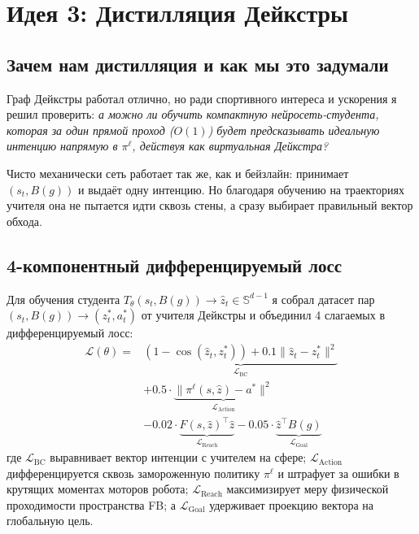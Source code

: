 \section{Идея 3: Дистилляция Дейкстры}

\subsection{Зачем нам дистилляция и как мы это задумали}

Граф Дейкстры работал отлично, но ради спортивного интереса и ускорения я решил проверить: \textit{а можно ли обучить компактную нейросеть-студента, которая за один прямой проход ($O(1)$) будет предсказывать идеальную интенцию напрямую в $\pi^\ell$, действуя как виртуальная Дейкстра?}

Чисто механически сеть работает так же, как и бейзлайн: принимает $(s_t, B(g))$ и выдаёт одну интенцию. Но благодаря обучению на траекториях учителя она не пытается идти сквозь стены, а сразу выбирает правильный вектор обхода.

\subsection{4-компонентный дифференцируемый лосс}

Для обучения студента $T_\theta(s_t, B(g)) \to \hat{z}_t \in \mathbb{S}^{d-1}$ я собрал датасет пар $(s_t, B(g)) \to (z^*_t, a^*_t)$ от учителя Дейкстры и объединил 4 слагаемых в дифференцируемый лосс:
\begin{equation}
\label{eq:distillation_loss}
\begin{split}
\mathcal{L}(\theta) = {} & \underbrace{(1 - \cos(\hat{z}_t, z^*_t)) + 0.1 \|\hat{z}_t - z^*_t\|^2}_{\mathcal{L}_{\text{BC}}} \\
& + 0.5 \cdot \underbrace{\|\pi^\ell(s, \hat{z}) - a^*\|^2}_{\mathcal{L}_{\text{Action}}} \\
& - 0.02 \cdot \underbrace{F(s, \hat{z})^\top \hat{z}}_{\mathcal{L}_{\text{Reach}}} - 0.05 \cdot \underbrace{\hat{z}^\top B(g)}_{\mathcal{L}_{\text{Goal}}}
\end{split}
\end{equation}
где $\mathcal{L}_{\text{BC}}$ выравнивает вектор интенции с учителем на сфере; $\mathcal{L}_{\text{Action}}$ дифференцируется сквозь замороженную политику $\pi^\ell$ и штрафует за ошибки в крутящих моментах моторов робота; $\mathcal{L}_{\text{Reach}}$ максимизирует меру физической проходимости пространства FB; а $\mathcal{L}_{\text{Goal}}$ удерживает проекцию вектора на глобальную цель.

